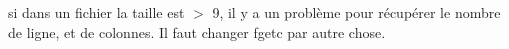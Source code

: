 
\begin{DoxyRefList}
\item[\label{bug__bug000001}%
\hypertarget{bug__bug000001}{}%
\-Membre \hyperlink{matrice_8c_ad3b953551d15e015f4f3027ae2f259da}{matrice\-\_\-chargement} (\-F\-I\-L\-E $\ast$fichier)]si dans un fichier la taille est $>$ 9, il y a un problème pour récupérer le nombre de ligne, et de colonnes. \-Il faut changer fgetc par autre chose. 
\end{DoxyRefList}